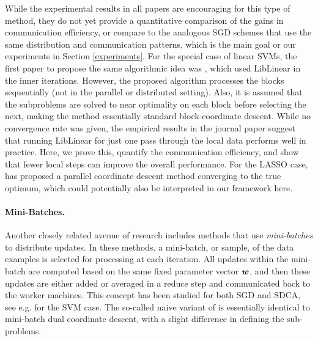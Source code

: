 \documentclass{article} %
\begin{document}
While the experimental results in all papers \cite{Yu:2010ct,Yang:2013vl,Yang:2013ui} 
are encouraging for this type of method, they do not yet provide a 
quantitative comparison of the gains in communication efficiency, or compare to 
the analogous SGD schemes that use the same distribution and 
communication patterns, which is the main goal or our experiments in 
Section \ref{experiments}.
%
For the special case of linear SVMs, the first paper to propose the same algorithmic
idea was \cite{Yu:2010ct}, which used \textsf{\small LibLinear} in the
inner iterations. However, the proposed algorithm \cite{Yu:2010ct} processes the blocks
sequentially (not in the parallel or distributed setting). Also, it is
assumed that the subproblems are solved to near optimality on each block
before selecting the next, making the method essentially standard
block-coordinate descent. While no convergence rate was given, the empirical
results in the journal paper \cite{Yu:2012fp} suggest that running
\textsf{\small LibLinear} for just one pass through the local data
performs well in practice. Here, we prove this, quantify the communication efficiency,
and show that fewer local steps can improve the overall performance.
For the {\textsc LASSO} case, \cite{Bradley:2011wq} has proposed a parallel coordinate
descent method converging to the true optimum, which could potentially also be 
interpreted in our framework here. %





\paragraph{Mini-Batches.}
Another closely related avenue of research includes methods that use \emph{mini-batches} to distribute updates. In these methods, a
mini-batch, or sample, of the data examples is selected for processing at
each iteration. All updates within the mini-batch are computed based on the
same fixed parameter vector ${\bm{w}}$, and then these updates are either added or
averaged in a reduce step and communicated back to the worker machines. This concept has been studied for both SGD and SDCA, see e.g. \cite{Takac:2013ut,Takac:2014vq} for the SVM case.
The so-called naive variant of \cite{Yang:2013vl} is essentially identical to mini-batch dual coordinate descent, with a slight difference in defining the sub-problems. 
\end{document}
